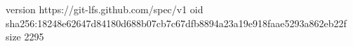 version https://git-lfs.github.com/spec/v1
oid sha256:18248e62647d84180d688b07cb7c67dfb8894a23a19e918faae5293a862eb22f
size 2295
